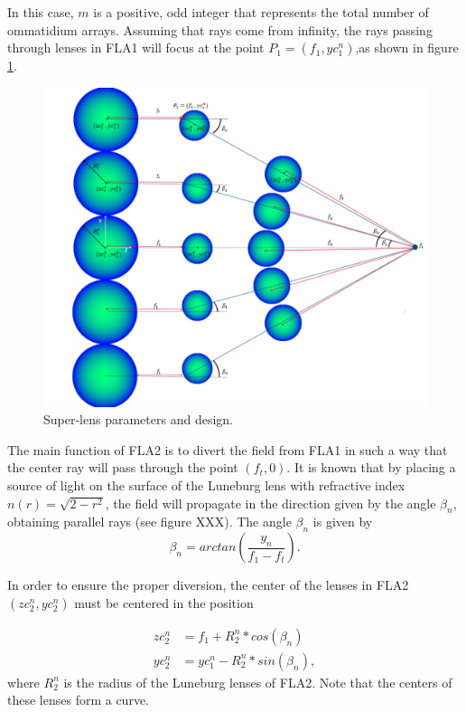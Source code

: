 In this case, $m$ is a positive, odd integer that represents the total number of ommatidium arrays. Assuming that rays come from infinity, the rays passing through lenses in FLA1 will focus at the point $P_1=(f_1,yc_1^n)$,as shown in figure \ref{fig:design}. \\

\begin{figure}[H]
    \centering
    \includegraphics[width=\columnwidth]{Figures/Superlens_Design_Parameters.png}
    \caption{Super-lens parameters and design.}
    \label{fig:design} 
\end{figure}

The main function of FLA2 is to divert the field from FLA1 in such a way that the center ray will pass through the point $(f_t,0)$. It is known that by placing a source of light on the surface of the Luneburg lens with refractive index $n(r) = \sqrt{2-r^2}$, the field will propagate in the direction given by the angle $\beta_n$, obtaining parallel rays (see figure XXX). The angle $\beta_n$ is given by
\begin{equation}
    \beta_n = arctan(\frac{y_n}{f_1-f_t}).
\end{equation}

In order to ensure the proper diversion, the center of the lenses in FLA2 $(zc_2^n,yc_2^n)$ must be centered in the position

\begin{equation}
\begin{split}
    zc_2^n &= f_1 + R_2^n*cos(\beta_n) \\
    yc_2^n &= yc_1^n - R_2^n*sin(\beta_n),
\end{split}
\end{equation}
where $R_2^n$ is the radius of the Luneburg lenses of FLA2. Note that the centers of these lenses form a curve. \\

